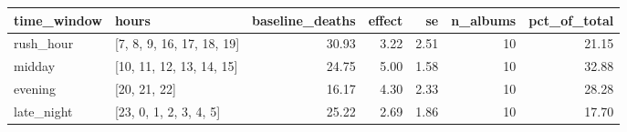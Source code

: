 \begin{tabular}{llrrrrr}
\toprule
time\_window & hours & baseline\_deaths & effect & se & n\_albums & pct\_of\_total \\
\midrule
rush\_hour & [7, 8, 9, 16, 17, 18, 19] & 30.93 & 3.22 & 2.51 & 10 & 21.15 \\
midday & [10, 11, 12, 13, 14, 15] & 24.75 & 5.00 & 1.58 & 10 & 32.88 \\
evening & [20, 21, 22] & 16.17 & 4.30 & 2.33 & 10 & 28.28 \\
late\_night & [23, 0, 1, 2, 3, 4, 5] & 25.22 & 2.69 & 1.86 & 10 & 17.70 \\
\bottomrule
\end{tabular}
